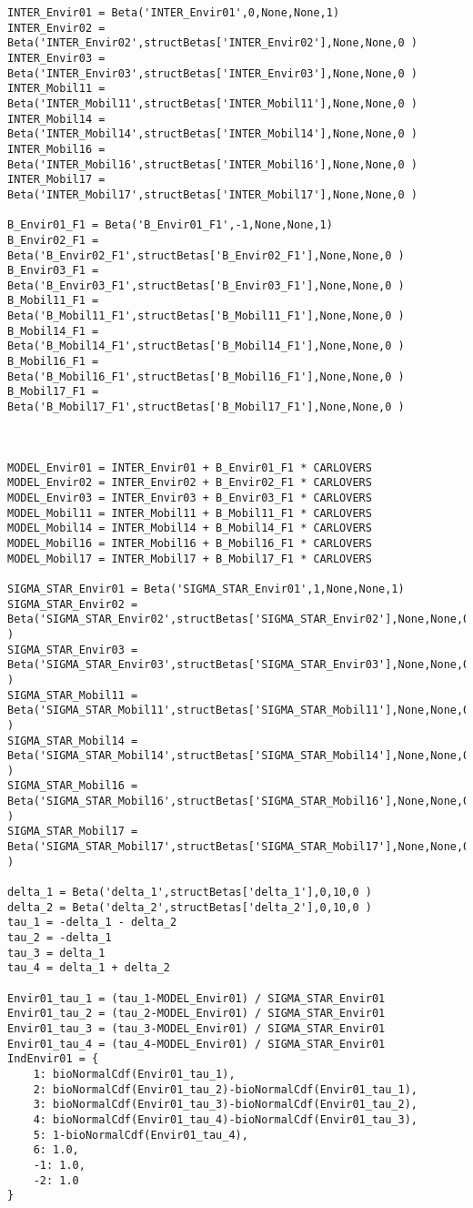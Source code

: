 \documentclass[12pt,a4paper]{article}
\begin{document}
\begin{lstlisting}[style=numbers]
INTER_Envir01 = Beta('INTER_Envir01',0,None,None,1)
INTER_Envir02 = Beta('INTER_Envir02',structBetas['INTER_Envir02'],None,None,0 )
INTER_Envir03 = Beta('INTER_Envir03',structBetas['INTER_Envir03'],None,None,0 )
INTER_Mobil11 = Beta('INTER_Mobil11',structBetas['INTER_Mobil11'],None,None,0 )
INTER_Mobil14 = Beta('INTER_Mobil14',structBetas['INTER_Mobil14'],None,None,0 )
INTER_Mobil16 = Beta('INTER_Mobil16',structBetas['INTER_Mobil16'],None,None,0 )
INTER_Mobil17 = Beta('INTER_Mobil17',structBetas['INTER_Mobil17'],None,None,0 )

B_Envir01_F1 = Beta('B_Envir01_F1',-1,None,None,1)
B_Envir02_F1 = Beta('B_Envir02_F1',structBetas['B_Envir02_F1'],None,None,0 )
B_Envir03_F1 = Beta('B_Envir03_F1',structBetas['B_Envir03_F1'],None,None,0 )
B_Mobil11_F1 = Beta('B_Mobil11_F1',structBetas['B_Mobil11_F1'],None,None,0 )
B_Mobil14_F1 = Beta('B_Mobil14_F1',structBetas['B_Mobil14_F1'],None,None,0 )
B_Mobil16_F1 = Beta('B_Mobil16_F1',structBetas['B_Mobil16_F1'],None,None,0 )
B_Mobil17_F1 = Beta('B_Mobil17_F1',structBetas['B_Mobil17_F1'],None,None,0 )



MODEL_Envir01 = INTER_Envir01 + B_Envir01_F1 * CARLOVERS
MODEL_Envir02 = INTER_Envir02 + B_Envir02_F1 * CARLOVERS
MODEL_Envir03 = INTER_Envir03 + B_Envir03_F1 * CARLOVERS
MODEL_Mobil11 = INTER_Mobil11 + B_Mobil11_F1 * CARLOVERS
MODEL_Mobil14 = INTER_Mobil14 + B_Mobil14_F1 * CARLOVERS
MODEL_Mobil16 = INTER_Mobil16 + B_Mobil16_F1 * CARLOVERS
MODEL_Mobil17 = INTER_Mobil17 + B_Mobil17_F1 * CARLOVERS

SIGMA_STAR_Envir01 = Beta('SIGMA_STAR_Envir01',1,None,None,1)
SIGMA_STAR_Envir02 = Beta('SIGMA_STAR_Envir02',structBetas['SIGMA_STAR_Envir02'],None,None,0 )
SIGMA_STAR_Envir03 = Beta('SIGMA_STAR_Envir03',structBetas['SIGMA_STAR_Envir03'],None,None,0 )
SIGMA_STAR_Mobil11 = Beta('SIGMA_STAR_Mobil11',structBetas['SIGMA_STAR_Mobil11'],None,None,0 )
SIGMA_STAR_Mobil14 = Beta('SIGMA_STAR_Mobil14',structBetas['SIGMA_STAR_Mobil14'],None,None,0 )
SIGMA_STAR_Mobil16 = Beta('SIGMA_STAR_Mobil16',structBetas['SIGMA_STAR_Mobil16'],None,None,0 )
SIGMA_STAR_Mobil17 = Beta('SIGMA_STAR_Mobil17',structBetas['SIGMA_STAR_Mobil17'],None,None,0 )

delta_1 = Beta('delta_1',structBetas['delta_1'],0,10,0 )
delta_2 = Beta('delta_2',structBetas['delta_2'],0,10,0 )
tau_1 = -delta_1 - delta_2
tau_2 = -delta_1 
tau_3 = delta_1
tau_4 = delta_1 + delta_2

Envir01_tau_1 = (tau_1-MODEL_Envir01) / SIGMA_STAR_Envir01
Envir01_tau_2 = (tau_2-MODEL_Envir01) / SIGMA_STAR_Envir01
Envir01_tau_3 = (tau_3-MODEL_Envir01) / SIGMA_STAR_Envir01
Envir01_tau_4 = (tau_4-MODEL_Envir01) / SIGMA_STAR_Envir01
IndEnvir01 = {
    1: bioNormalCdf(Envir01_tau_1),
    2: bioNormalCdf(Envir01_tau_2)-bioNormalCdf(Envir01_tau_1),
    3: bioNormalCdf(Envir01_tau_3)-bioNormalCdf(Envir01_tau_2),
    4: bioNormalCdf(Envir01_tau_4)-bioNormalCdf(Envir01_tau_3),
    5: 1-bioNormalCdf(Envir01_tau_4),
    6: 1.0,
    -1: 1.0,
    -2: 1.0
}


\end{lstlisting}
\end{document}
